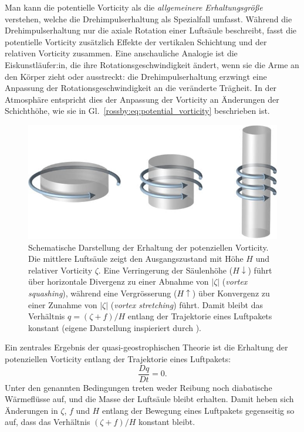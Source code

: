 Man kann die potentielle Vorticity als die \emph{allgemeinere Erhaltungsgröße}
verstehen, welche die Drehimpulserhaltung als Spezialfall umfasst. Während
die Drehimpulserhaltung nur die axiale Rotation einer Luftsäule beschreibt,
fasst die potentielle Vorticity zusätzlich Effekte der vertikalen Schichtung
und der relativen Vorticity zusammen. Eine anschauliche Analogie ist die
Eiskunstläufer:in, die ihre Rotationsgeschwindigkeit ändert, wenn sie die Arme
an den Körper zieht oder ausstreckt: die Drehimpulserhaltung erzwingt eine
Anpassung der Rotationsgeschwindigkeit an die veränderte Trägheit. In der
Atmosphäre entspricht dies der Anpassung der Vorticity an Änderungen der
Schichthöhe, wie sie in Gl.~\eqref{rossby:eq:potential_vorticity} beschrieben ist.



\begin{figure}
	\centering
	\includegraphics[width=\textwidth]{papers/rossby/images/column_streching.jpeg}


	\caption{%
		Schematische Darstellung der Erhaltung der potenziellen Vorticity.
		Die mittlere Luftsäule zeigt den Ausgangszustand mit Höhe $H$ und relativer
		Vorticity $\zeta$. Eine Verringerung der Säulenhöhe ($H \downarrow$) führt
		über horizontale Divergenz zu einer Abnahme von $|\zeta|$
		(\emph{vortex squashing}), während eine Vergrösserung ($H \uparrow$) über
		Konvergenz zu einer Zunahme von $|\zeta|$ (\emph{vortex stretching}) führt.
		Damit bleibt das Verhältnis $q=(\zeta+f)/H$ entlang der Trajektorie eines
		Luftpakets konstant (eigene Darstellung inspieriert durch \cite{rossby:beal_pv}).%
	}
	\label{fig:pv_conservation}
\end{figure}


Ein zentrales Ergebnis der quasi-geostrophischen Theorie ist die Erhaltung der
potenziellen Vorticity entlang der Trajektorie eines Luftpakets:
\begin{equation}
	\frac{Dq}{Dt} = 0.
	\label{rossby:eq:pv_conservation}
\end{equation}
Unter den genannten Bedingungen treten weder Reibung noch diabatische Wärmeflüsse auf, und die Masse der Luftsäule bleibt erhalten.
Damit heben sich Änderungen in \(\zeta\), \(f\) und \(H\) entlang der Bewegung eines Luftpakets gegenseitig so auf, dass das Verhältnis \((\zeta + f)/H\) konstant bleibt.

